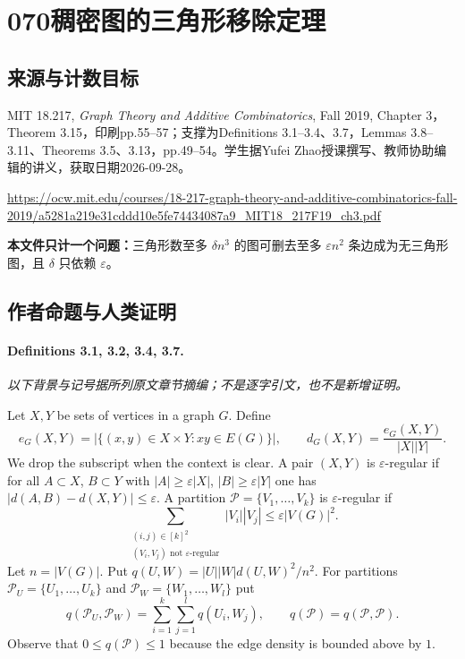 \documentclass[UTF8,11pt]{ctexart}
\theoremstyle{definition}
\begin{document}
\section*{070\quad 稠密图的三角形移除定理}
\subsection*{来源与计数目标}
MIT 18.217, \emph{Graph Theory and Additive Combinatorics}, Fall 2019, Chapter 3，Theorem 3.15，印刷pp.55--57；支撑为Definitions 3.1--3.4、3.7，Lemmas 3.8--3.11、Theorems 3.5、3.13，pp.49--54。学生据Yufei Zhao授课撰写、教师协助编辑的讲义，获取日期2026-09-28。
\par\url{https://ocw.mit.edu/courses/18-217-graph-theory-and-additive-combinatorics-fall-2019/a5281a219e31cddd10e5fe74434087a9_MIT18_217F19_ch3.pdf}
\par\textbf{本文件只计一个问题：}三角形数至多 $\delta n^3$ 的图可删去至多 $\varepsilon n^2$ 条边成为无三角形图，且 $\delta$ 只依赖 $\varepsilon$。
\subsection*{作者命题与人类证明}
\paragraph{Definitions 3.1, 3.2, 3.4, 3.7.}
\noindent\textit{以下背景与记号据所列原文章节摘编；不是逐字引文，也不是新增证明。}\par
Let $X,Y$ be sets of vertices in a graph $G$. Define
\[e_G(X,Y)=|\{(x,y)\in X\times Y:xy\in E(G)\}|,\qquad d_G(X,Y)=\frac{e_G(X,Y)}{|X||Y|}.\]
We drop the subscript when the context is clear. A pair $(X,Y)$ is $\varepsilon$-regular if for all $A\subset X$, $B\subset Y$ with $|A|\geq\varepsilon|X|$, $|B|\geq\varepsilon|Y|$ one has $|d(A,B)-d(X,Y)|\leq\varepsilon$. A partition $\mathcal P=\{V_1,\ldots,V_k\}$ is $\varepsilon$-regular if
\[\sum_{\substack{(i,j)\in[k]^2\\(V_i,V_j)\text{ not }\varepsilon\text{-regular}}}|V_i||V_j|\leq\varepsilon|V(G)|^2.\]
Let $n=|V(G)|$. Put $q(U,W)=|U||W|d(U,W)^2/n^2$. For partitions $\mathcal P_U=\{U_1,\ldots,U_k\}$ and $\mathcal P_W=\{W_1,\ldots,W_l\}$ put
\[q(\mathcal P_U,\mathcal P_W)=\sum_{i=1}^k\sum_{j=1}^lq(U_i,W_j),\qquad q(\mathcal P)=q(\mathcal P,\mathcal P).\]
Observe that $0\leq q(\mathcal P)\leq1$ because the edge density is bounded above by $1$.
\end{document}

